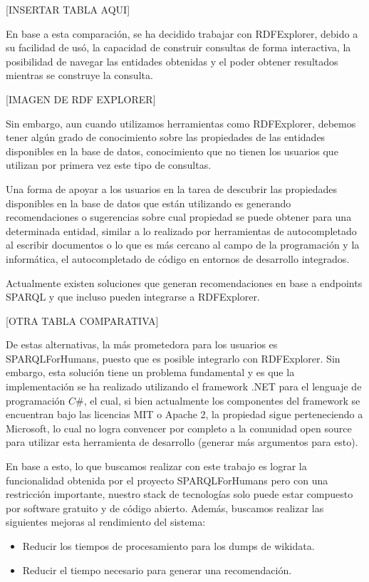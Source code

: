 \documentclass[conference,compsoc]{IEEEtran}
\begin{document}
[INSERTAR TABLA AQUI]

En base a esta comparación, se ha decidido trabajar con RDFExplorer, debido a su
facilidad de usó, la capacidad de construir consultas de forma interactiva, 
la posibilidad de navegar las entidades obtenidas y el poder obtener resultados
mientras se construye la consulta.

[IMAGEN DE RDF EXPLORER]

Sin embargo, aun cuando utilizamos herramientas como RDFExplorer, debemos tener
algún grado de conocimiento sobre las propiedades de las entidades disponibles
en la base de datos, conocimiento que no tienen los usuarios que utilizan por primera
vez este tipo de consultas.

Una forma de apoyar a los usuarios en la tarea de descubrir las propiedades disponibles
en la base de datos que están utilizando es generando recomendaciones o sugerencias
sobre cual propiedad se puede obtener para una determinada entidad, similar a lo
realizado por herramientas de autocompletado al escribir documentos o lo que es más
cercano al campo de la programación y la informática, el autocompletado de código en
entornos de desarrollo integrados.

Actualmente existen soluciones que generan recomendaciones en base a endpoints SPARQL
y que incluso pueden integrarse a RDFExplorer.

[OTRA TABLA COMPARATIVA]

De estas alternativas, la más prometedora para los usuarios es SPARQLForHumans, puesto
que es posible integrarlo con RDFExplorer. Sin embargo, esta solución tiene un
problema fundamental y es que la implementación se ha realizado utilizando el
framework .NET para el lenguaje de programación $C\#$, el cual, si bien actualmente los
componentes del framework se encuentran bajo las licencias MIT o Apache 2, la propiedad
sigue perteneciendo a Microsoft, lo cual no logra convencer por completo a la comunidad
open source para utilizar esta herramienta de desarrollo (generar más argumentos para esto).

En base a esto, lo que buscamos realizar con este trabajo es lograr la funcionalidad obtenida por
el proyecto SPARQLForHumans pero con una restricción importante, nuestro stack de 
tecnologías solo puede estar compuesto por software gratuito y de código abierto.
Además, buscamos realizar las siguientes mejoras al rendimiento del sistema:

\begin{itemize}
    \item Reducir los tiempos de procesamiento para los dumps de wikidata.
    \item Reducir el tiempo necesario para generar una recomendación.
\end{itemize}
\end{document}
